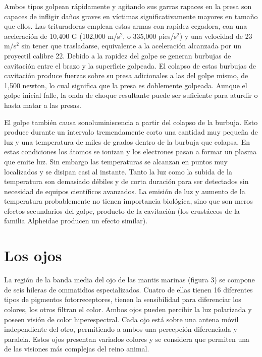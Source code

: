 \documentclass[10pt,twocolumn]{article}
\begin{document}
Ambos tipos golpean rápidamente y agitando sus garras rapaces en la presa son capaces de infligir daños graves en víctimas significativamente mayores en tamaño que ellos. Las trituradoras emplean estas armas con rapidez cegadora, con una aceleración de 10,400 G (102,000 m/s$^{2}$, o 335,000 pies/s$^{2}$) y una velocidad de 23 m/s$^{2}$ sin tener que trasladarse\cite{patek_deadly_2004}, equivalente a la aceleración alcanzada por un proyectil calibre 22. Debido a la rapidez del golpe se generan burbujas de cavitación entre el brazo y la superficie golpeada. El colapso de estas burbujas de cavitación produce fuerzas sobre su presa adicionales a las del golpe mismo, de 1,500 newton, lo cual significa que la presa es doblemente golpeada. Aunque el golpe inicial falle, la onda de choque resultante puede ser suficiente para aturdir o hasta matar a las presas.

El golpe también causa sonoluminiscencia a partir del colapso de la burbuja. Esto produce durante un intervalo tremendamente corto una cantidad muy pequeña de luz y una temperatura de miles de grados dentro de la burbuja que colapsa. En estas condiciones los átomos se ionizan y los electrones pasan a formar un plasma que emite luz. Sin embargo las temperaturas se alcanzan en puntos muy localizados y se disipan casi al instante. Tanto la luz como la subida de la temperatura son demasiado débiles y de corta duración para ser detectados sin necesidad de equipos científicos avanzados. La emisión de luz y aumento de la temperatura probablemente no tienen importancia biológica, sino que son meros efectos secundarios del golpe, producto de la cavitación (los crustáceos de la familia Alpheidae producen un efecto similar).

\section{Los ojos}

La región de la banda media del ojo de las mantis marinas (figura 3) se compone de seis hileras de ommatidios especializados. Cuatro de ellas tienen 16 diferentes tipos de pigmentos fotorreceptores, tienen la sensibilidad para diferenciar los colores, los otros filtran el color. Ambos ojos pueden percibir la luz polarizada y poseen visión de color hiperespectral. Cada ojo está sobre una antena móvil independiente del otro, permitiendo a ambos una percepción diferenciada y paralela. Estos ojos presentan variados colores y se considera que permiten una de las visiones más complejas del reino animal.
\end{document}
